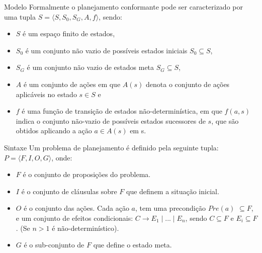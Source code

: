 % 
% 


\begin{frame}{Modelo}
Formalmente o planejamento conformante pode ser caracterizado por uma tupla 
$S=\langle S, S_0, S_G, A, f \rangle$, sendo:
\begin{itemize}
\item $S$ é um espaço finito de estados,
\item $S_0$ é um conjunto não vazio de possíveis estados iniciais $S_0\subseteq 
S$,
\item $S_G$ é um conjunto não vazio de estados meta $S_G \subseteq S$,
\item $A$ é um conjunto de ações em que $A(s)$ denota o conjunto de ações 
aplicáveis no estado $s \in S$ e
\item $f$ é uma função de transição de estados não-determinística, em que 
$f(a,s)$ indica o conjunto não-vazio de possíveis estados sucessores de $s$, que 
são obtidos aplicando a ação $a \in A(s)$ em s.
\end{itemize}
\end{frame}


\begin{frame}{Sintaxe}
Um problema de planejamento é definido pela seguinte tupla: $P=\langle F, I, O, G\rangle$, 
onde:
\begin{itemize}
 \item $F$ é o conjunto de proposições do problema.
 \item $I$ é o conjunto de cláusulas sobre $F$ que definem a situação inicial.
 \item $O$ é o conjunto das ações. Cada ação $a$, tem uma precondição $Pre(a)$ 
$\subseteq F$, e um conjunto de efeitos condicionais: $C\rightarrow E_1 \mid ... 
\mid E_n$, sendo $C\subseteq F$ e $E_i \subseteq F$. (Se $n > 1$ é 
não-determinístico). 
 \item $G$ é o sub-conjunto de $F$ que define o estado meta. 
\end{itemize}

\end{frame}


